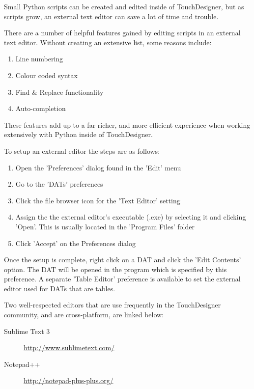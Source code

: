 \begin{fullwidth}

Small Python scripts can be created and edited inside of TouchDesigner, but as scripts grow, an external text editor can save a lot of time and trouble.

There are a number of helpful features gained by editing scripts in an external text editor. Without creating an extensive list, some reasons include:

\begin{enumerate}
\item Line numbering 
\item Colour coded syntax
\item Find \& Replace functionality
\item Auto-completion
\end{enumerate}

These features add up to a far richer, and more efficient experience when working extensively with Python inside of TouchDesigner.  

To setup an external editor the steps are as follows:

\begin{enumerate}
\item Open the 'Preferences' dialog found in the 'Edit' menu
\item Go to the 'DATs' preferences
\item Click the file browser icon for the 'Text Editor' setting
\item Assign the the external editor's executable (.exe) by selecting it and clicking 'Open'.  This is usually located in the 'Program Files' folder
\item Click 'Accept' on the Preferences dialog
\end{enumerate}

Once the setup is complete, right click on a DAT and click the 'Edit Contents' option. The DAT will be opened in the program which is specified by this preference.  A separate 'Table Editor' preference is available to set the external editor used for DATs that are tables.

Two well-respected editors that are use frequently in the TouchDesigner community, and are cross-platform, are linked below: 

\begin{description}
\item[Sublime Text 3] \url{http://www.sublimetext.com/}
\item[Notepad++] \url{http://notepad-plus-plus.org/}
\end{description}

\end{fullwidth}

